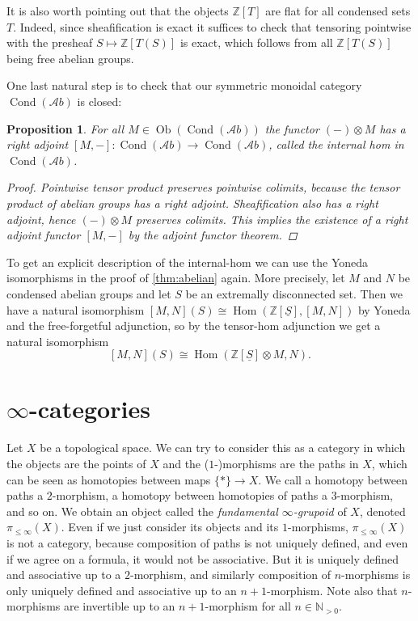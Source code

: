 \documentclass[11pt,A4]{article}
\theoremstyle{plain}
\newtheorem{prop}[thm]{Proposition}
\theoremstyle{definition}
\theoremstyle{remark}
\newcommand{\N}{\mathbb{N}}
\newcommand{\Z}{\mathbb{Z}}
\newcommand{\1}{\mathbbm{1}}
\newcommand{\Ab}{\mathscr{A}b}
\DeclareMathOperator{\Hom}{Hom}
\DeclareMathOperator{\Cond}{Cond}
\DeclareMathOperator{\Ob}{Ob}
\renewcommand{\u}[1]{\underline{#1}}
\newcommand{\ot}{\otimes}
\begin{document}
It is also worth pointing out that the objects $\Z[T]$ are flat for all condensed sets $T$.
Indeed, since sheafification is exact it suffices to check that tensoring pointwise with the presheaf $S\mapsto \Z[T(S)]$ is exact, which follows from all $\Z[T(S)]$ being free abelian groups.

One last natural step is to check that our symmetric monoidal category $\Cond(\Ab)$ is closed:

\begin{prop}
    For all $M\in \Ob(\Cond(\Ab))$ the functor $(-)\ot M$ has a right adjoint $[M,-]\colon \Cond(\Ab)\to \Cond(\Ab)$, called the \textit{internal hom} in $\Cond(\Ab)$.
    \begin{proof}
	Pointwise tensor product preserves pointwise colimits, because the tensor product of abelian groups has a right adjoint.
	Sheafification also has a right adjoint, hence $(-)\ot M$ preserves colimits.
	This implies the existence of a right adjoint functor $[M,-]$ by the adjoint functor theorem.
    \end{proof}
\end{prop}

To get an explicit description of the internal-hom we can use the Yoneda isomorphisms in the proof of \cref{thm:abelian} again.
More precisely, let $M$ and $N$ be condensed abelian groups and let $S$ be an extremally disconnected set.
Then we have a natural isomorphism $[M,N](S)\cong \Hom(\Z[\u{S}],[M,N])$ by Yoneda and the free-forgetful adjunction, so by the tensor-hom adjunction we get a natural isomorphism
\[ [M,N](S)\cong \Hom(\Z[\u{S}]\ot M,N).\]


\section{$\infty$-categories}

Let $X$ be a topological space.
We can try to consider this as a category in which the objects are the points of $X$ and the ($1$-)morphisms are the paths in $X$, which can be seen as homotopies between maps $\{ *\}\to X$.
We call a homotopy between paths a $2$-morphism, a homotopy between homotopies of paths a $3$-morphism, and so on.
We obtain an object called the \textit{fundamental $\infty$-grupoid} of $X$, denoted $\pi_{\leqslant \infty}(X)$.
Even if we just consider its objects and its $1$-morphisms, $\pi_{\leqslant \infty }(X)$ is not a category, because composition of paths is not uniquely defined, and even if we agree on a formula, it would not be associative.
But it is uniquely defined and associative up to a $2$-morphism, and similarly composition of $n$-morphisms is only uniquely defined and associative up to an $n+1$-morphism.
Note also that $n$-morphisms are invertible up to an $n+1$-morphism for all $n\in \N_{>0}$.
\end{document}
